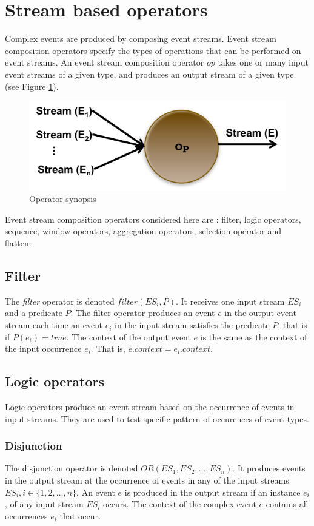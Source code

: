  \section{Stream based operators}
 \label{ch3:sec2.3.3}
 Complex events are produced by composing event streams. Event stream composition operators specify the types of operations that can be performed on event streams. An event stream composition operator $op$ takes one or many input event streams of a given type, and produces an output stream of a given type (see Figure \ref{fig:op}).
 \begin{figure}[H]
  \begin{center}
    \includegraphics[scale=0.65]{chap3/images/op.pdf}
  \end{center}
  \caption{Operator synopsis}
  \label{fig:op}
\end{figure}
Event stream composition operators considered here are : filter, logic operators, sequence, window operators, aggregation operators, selection operator and flatten.  
  \subsection{Filter}
  The \textit{filter} operator is denoted $filter (ES_i, P)$. It receives one input stream $ES_i$ and a predicate $P$. The filter operator produces an event $e$ in the output event stream each time an event $e_i$ in the input stream satisfies the predicate $P$, that is if $P(e_i)= true$. The context of the output event $e$ is the same as the context of the input occurrence $e_i$.
  That is, $e.context = e_i.context$.
 \subsection{Logic operators}
 Logic operators produce an event stream based on the occurrence of events in input streams. They are used to test specific pattern of occurences of event types.
 
 \subsubsection{Disjunction}
 The disjunction operator is denoted $OR(ES_1, ES_2, …, ES_n)$. It produces events in the output stream at the occurrence of events in any of the input streams $ES_i, i \in \{1, 2, …,n\}$. An event $e$ is produced in the output stream if an instance $e_i$, of any input stream $ES_i$ occurs. The context of the complex event $e$ contains all occurrences $e_i$ that occur.
 
